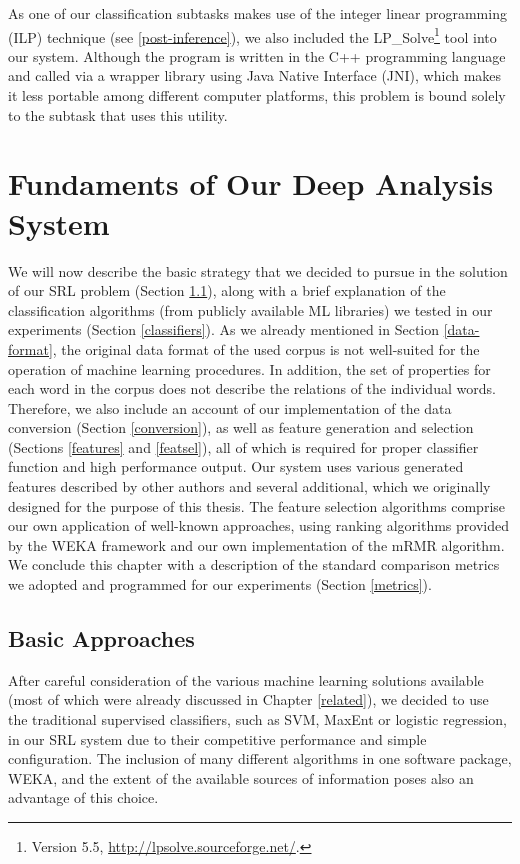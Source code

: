 \documentclass[12pt,notitlepage]{report}
\begin{document}
As one of our classification subtasks makes use of the integer linear programming (ILP) technique (see \ref{post-inference}), we also included the LP\_Solve\footnote{Version 5.5, \url{http://lpsolve.sourceforge.net/}.} tool into our system. Although the program is written in the C++ programming language and called via a wrapper library using Java Native Interface (JNI), which makes it less portable among different computer platforms, this problem is bound solely to the subtask that uses this utility.

%
%
\chapter{Fundaments of Our Deep Analysis System}\label{ml-semantic}
%
%

We will now describe the basic strategy that we decided to pursue in the solution of our SRL problem (Section \ref{approach}), along with a brief explanation of the classification algorithms (from publicly available ML libraries) we tested in our experiments (Section \ref{classifiers}). As we already mentioned in Section \ref{data-format}, the original data format of the used corpus is not well-suited for the operation of machine learning procedures. In addition, the set of properties for each word in the corpus does not describe the relations of the individual words. Therefore, we also include an account of our implementation of the data conversion (Section \ref{conversion}), as well as feature generation and selection (Sections \ref{features} and \ref{featsel}), all of which is required for proper classifier function and high performance output. Our system uses various generated features described by other authors and several additional, which we originally designed for the purpose of this thesis. The feature selection algorithms comprise our own application of well-known approaches, using ranking algorithms provided by the WEKA framework and our own implementation of the mRMR algorithm. We conclude this chapter with a description of the standard comparison metrics we adopted and programmed for our experiments (Section \ref{metrics}).

\section{Basic Approaches}\label{approach}

After careful consideration of the various machine learning solutions available (most of which were already discussed in Chapter \ref{related}), we decided to use the traditional supervised classifiers, such as SVM, MaxEnt or logistic regression, in our SRL system due to their competitive performance and simple configuration. The inclusion of many different algorithms in one software package, WEKA, and the extent of the available sources of information poses also an advantage of this choice.
\end{document}
